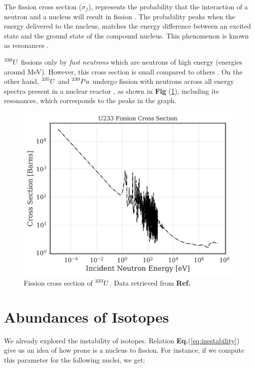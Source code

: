  The fission cross section ($\sigma_{f}$), represents the probability that the interaction of a neutron and a nucleus will result in fission \cite{Stacey_2010}. The probability peaks when the energy delivered to the nucleus, matches the energy difference between an excited state and the ground state of the compound nucleus. This phenomenon is known as resonances \cite{Stacey_2010}. 

$\prescript{238}{}{U}$ fissions only by \textit{fast neutrons} which are neutrons of high energy (energies around MeV). However, this cross section is small compared to others \cite{Notas_sanabricas}. On the other hand, $\prescript{235}{}{U}$ and $\prescript{239}{}{Pu}$ undergo fission with neutrons across all energy spectra present in a nuclear reactor \cite{Notas_sanabricas}, as shown in \textbf{Fig} (\ref{fig:Cross_section_fission}), including its resonances, which corresponds to the peaks in the graph.

\begin{figure}
    \centering
    \includegraphics[width=0.75\linewidth]{Kap2/Figures/U233_Cross_Section.png}
    \caption{Fission cross section of $\prescript{233}{}{U}$. Data retrieved from \textbf{Ref.} \cite{NNDC}}
    \label{fig:Cross_section_fission}
\end{figure}

\section{Abundances of Isotopes}
\label{sec:possible_fuels}

We already explored the instability of isotopes. Relation \textbf{Eq.}(\ref{eq:inestability}) give us an idea of how prone is a nucleus to fission. For instance, if we compute this parameter for the following nuclei, we get:

